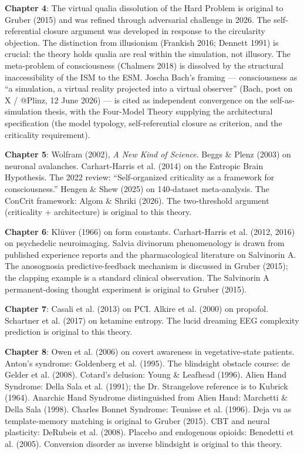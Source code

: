 \documentclass[11pt, twoside, openright]{book}
\begin{document}
\textbf{Chapter 4}: The virtual qualia dissolution of the Hard Problem is original to Gruber (2015) and was refined through adversarial challenge in 2026. The self-referential closure argument was developed in response to the circularity objection. The distinction from illusionism (Frankish 2016; Dennett 1991) is crucial: the theory holds qualia are real within the simulation, not illusory. The meta-problem of consciousness (Chalmers 2018) is dissolved by the structural inaccessibility of the ISM to the ESM. Joscha Bach's framing --- consciousness as ``a simulation, a virtual reality projected into a virtual observer'' (Bach, post on X / @Plinz, 12 June 2026) --- is cited as independent convergence on the self-as-simulation thesis, with the Four-Model Theory supplying the architectural specification (the model typology, self-referential closure as criterion, and the criticality requirement).

\textbf{Chapter 5}: Wolfram (2002), \textit{A New Kind of Science}. Beggs \& Plenz (2003) on neuronal avalanches. Carhart-Harris et al. (2014) on the Entropic Brain Hypothesis. The 2022 review: ``Self-organized criticality as a framework for consciousness.'' Hengen \& Shew (2025) on 140-dataset meta-analysis. The ConCrit framework: Algom \& Shriki (2026). The two-threshold argument (criticality + architecture) is original to this theory.

\textbf{Chapter 6}: Klüver (1966) on form constants. Carhart-Harris et al. (2012, 2016) on psychedelic neuroimaging. Salvia divinorum phenomenology is drawn from published experience reports and the pharmacological literature on Salvinorin A. The anosognosia predictive-feedback mechanism is discussed in Gruber (2015); the clapping example is a standard clinical observation. The Salvinorin A permanent-dosing thought experiment is original to Gruber (2015).

\textbf{Chapter 7}: Casali et al. (2013) on PCI. Alkire et al. (2000) on propofol. Schartner et al. (2017) on ketamine entropy. The lucid dreaming EEG complexity prediction is original to this theory.

\textbf{Chapter 8}: Owen et al. (2006) on covert awareness in vegetative-state patients. Anton's syndrome: Goldenberg et al. (1995). The blindsight obstacle course: de Gelder et al. (2008). Cotard's delusion: Young \& Leafhead (1996). Alien Hand Syndrome: Della Sala et al. (1991); the Dr. Strangelove reference is to Kubrick (1964). Anarchic Hand Syndrome distinguished from Alien Hand: Marchetti \& Della Sala (1998). Charles Bonnet Syndrome: Teunisse et al. (1996). Deja vu as template-memory matching is original to Gruber (2015). CBT and neural plasticity: DeRubeis et al. (2008). Placebo and endogenous opioids: Benedetti et al. (2005). Conversion disorder as inverse blindsight is original to this theory.
\end{document}
